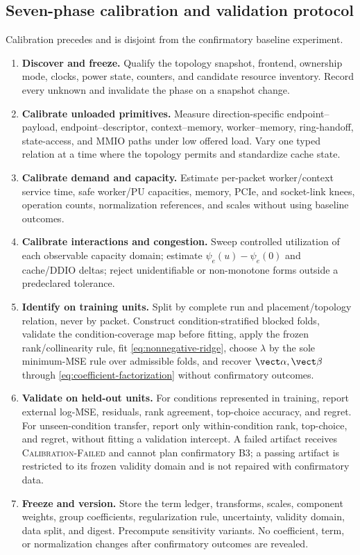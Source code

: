 \subsection{Seven-phase calibration and validation protocol}

Calibration precedes and is disjoint from the confirmatory baseline experiment.

\begin{enumerate}[leftmargin=*,itemsep=2pt]
  \item \textbf{Discover and freeze.} Qualify the topology snapshot, frontend, ownership mode, clocks, power state, counters, and candidate resource inventory. Record every unknown and invalidate the phase on a snapshot change.
  \item \textbf{Calibrate unloaded primitives.} Measure direction-specific endpoint--payload, endpoint--descriptor, context--memory, worker--memory, ring-handoff, state-access, and MMIO paths under low offered load. Vary one typed relation at a time where the topology permits and standardize cache state.
  \item \textbf{Calibrate demand and capacity.} Estimate per-packet worker/context service time, safe worker/PU capacities, memory, PCIe, and socket-link knees, operation counts, normalization references, and scales without using baseline outcomes.
  \item \textbf{Calibrate interactions and congestion.} Sweep controlled utilization of each observable capacity domain; estimate $\psi_e(u)-\psi_e(0)$ and cache/DDIO deltas; reject unidentifiable or non-monotone forms outside a predeclared tolerance.
  \item \textbf{Identify on training units.} Split by complete run and placement/topology relation, never by packet. Construct condition-stratified blocked folds, validate the condition-coverage map before fitting, apply the frozen rank/collinearity rule, fit \cref{eq:nonnegative-ridge}, choose $\lambda$ by the sole minimum-MSE rule over admissible folds, and recover $\vect\alpha,\vect\beta$ through \cref{eq:coefficient-factorization} without confirmatory outcomes.
  \item \textbf{Validate on held-out units.} For conditions represented in training, report external log-MSE, residuals, rank agreement, top-choice accuracy, and regret. For unseen-condition transfer, report only within-condition rank, top-choice, and regret, without fitting a validation intercept. A failed artifact receives \textsc{Calibration-Failed} and cannot plan confirmatory B3; a passing artifact is restricted to its frozen validity domain and is not repaired with confirmatory data.
  \item \textbf{Freeze and version.} Store the term ledger, transforms, scales, component weights, group coefficients, regularization rule, uncertainty, validity domain, data split, and digest. Precompute sensitivity variants. No coefficient, term, or normalization changes after confirmatory outcomes are revealed.
\end{enumerate}

